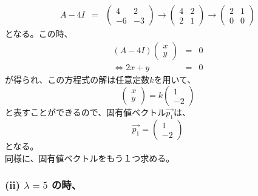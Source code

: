 \documentclass[a4j]{jsarticle}
\begin{document}
\begin{spacing}{1.6}
\begin{qparts}
  \begin{eqnarray*}
    A - 4I & = &
    \left(
    \begin{array}{ccc}
      4 & 2 \\
      -6 & -3
    \end{array}
    \right)
    \rightarrow
    \left(
    \begin{array}{ccc}
      4 & 2 \\
      2 & 1
    \end{array}
    \right)
    \rightarrow
    \left(
    \begin{array}{ccc}
      2 & 1 \\
      0 & 0
    \end{array}
    \right)
  \end{eqnarray*}
  となる。この時、
  \begin{eqnarray*}
    (A - 4I) \left(
    \begin{array}{ccc}
      x \\
      y
    \end{array}
    \right)
    & = & 0 \\
    \Leftrightarrow
    2x + y & = & 0
  \end{eqnarray*}
  が得られ、この方程式の解は任意定数$k$を用いて、
  \begin{equation*}
    \left(
    \begin{array}{ccc}
      x \\
      y
    \end{array}
    \right)
    = k
    \left(
    \begin{array}{ccc}
      1 \\
      -2
    \end{array}
    \right)
  \end{equation*}
  と表すことができるので、固有値ベクトル$\overrightarrow{p_1}$は、
  \begin{equation}
    \overrightarrow{p_1} =
    \left(
    \begin{array}{ccc}
      1 \\
      -2
    \end{array}
    \right)
  \end{equation}
  となる。\\

  同様に、固有値ベクトルをもう１つ求める。

  \subsubsection*{(ii) $ \lambda = 5 $ の時、}


\end{qparts}
\end{spacing}
\end{document}
